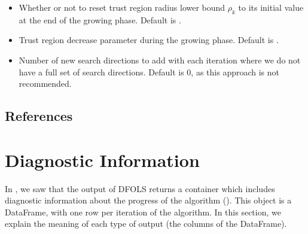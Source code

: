 \documentclass[letterpaper,10pt,english]{sphinxmanual}
\begin{document}
\begin{itemize}
\item {} 
 \sphinxhyphen{} Whether or not to reset trust region radius lower bound \(\rho_k\) to its initial value at the end of the growing phase. Default is .

\item {} 
 \sphinxhyphen{} Trust region decrease parameter during the growing phase. Default is .

\item {} 
 \sphinxhyphen{} Number of new search directions to add with each iteration where we do not have a full set of search directions. Default is 0, as this approach is not recommended.

\end{itemize}


\section{References}
\label{\detokenize{advanced:references}}

\chapter{Diagnostic Information}
\label{\detokenize{diagnostic:diagnostic-information}}\label{\detokenize{diagnostic::doc}}
In {\hyperref[\detokenize{userguide::doc}]{}}, we saw that the output of DFO\sphinxhyphen{}LS returns a container which includes diagnostic information about the progress of the algorithm (). This object is a  DataFrame, with one row per iteration of the algorithm. In this section, we explain the meaning of each type of output (the columns of the DataFrame).
\end{document}

